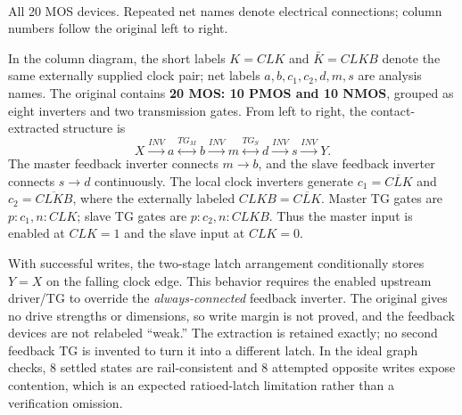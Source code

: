 \documentclass[10pt]{article}
\newcommand{\mos}[4]{\begin{scope}[shift={(#1,#2)}]
\draw (0,.24)--(0,-.24);\draw (0,.20)--(.25,.20)--(.25,.5);
\draw (0,-.20)--(.25,-.20)--(.25,-.5);\draw (-.16,.23)--(-.16,-.23);
\ifnum#4=1\draw (-.26,0) circle (.06);\draw (-.75,0)--(-.32,0);\else\draw (-.75,0)--(-.16,0);\fi
\node[anchor=east,font=\scriptsize] at (-.76,0) {$#3$};\end{scope}}
\newcommand{\ground}[2]{\draw (#1,#2)--(#1,{#2-.12});\draw ({#1-.17},{#2-.12})--({#1+.17},{#2-.12});\draw ({#1-.11},{#2-.20})--({#1+.11},{#2-.20});}
\newcommand{\gnd}[2]{\ground{#1}{#2}}
\begin{document}
\begin{center}
\\All 20 MOS devices. Repeated net names denote electrical connections; column numbers follow the original left to right.\end{center}

In the column diagram, the short labels $K=CLK$ and $\bar K=CLKB$ denote the same externally supplied clock pair; net labels $a,b,c_1,c_2,d,m,s$ are analysis names.
The original contains \textbf{20 MOS: 10 PMOS and 10 NMOS}, grouped as eight inverters and two transmission gates. From left to right, the contact-extracted structure is
\[X\xrightarrow{INV}a\overset{TG_M}{\longleftrightarrow}b\xrightarrow{INV}m\overset{TG_S}{\longleftrightarrow}d\xrightarrow{INV}s\xrightarrow{INV}Y.\]
The master feedback inverter connects $m\to b$, and the slave feedback inverter connects $s\to d$ continuously. The local clock inverters generate $c_1=\overline{CLK}$ and $c_2=\overline{CLKB}$, where the externally labeled $CLKB=\overline{CLK}$. Master TG gates are $p:c_1,n:CLK$; slave TG gates are $p:c_2,n:CLKB$. Thus the master input is enabled at $CLK=1$ and the slave input at $CLK=0$.

With successful writes, the two-stage latch arrangement conditionally stores $Y=X$ on the falling clock edge. This behavior requires the enabled upstream driver/TG to override the \emph{always-connected} feedback inverter. The original gives no drive strengths or dimensions, so write margin is not proved, and the feedback devices are not relabeled ``weak.'' The extraction is retained exactly; no second feedback TG is invented to turn it into a different latch. In the ideal graph checks, 8 settled states are rail-consistent and 8 attempted opposite writes expose contention, which is an expected ratioed-latch limitation rather than a verification omission.
\end{document}
